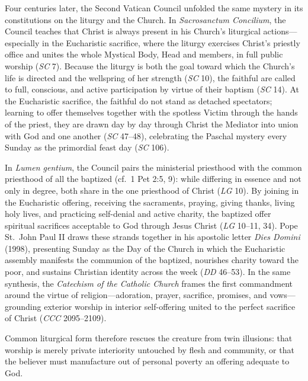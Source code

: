 Four centuries later, the Second Vatican Council unfolded the same mystery in its constitutions on the liturgy and the Church. In \emph{Sacrosanctum Concilium}, the Council teaches that Christ is always present in his Church's liturgical actions---especially in the Eucharistic sacrifice, where the liturgy exercises Christ's priestly office and unites the whole Mystical Body, Head and members, in full public worship (\emph{SC} 7). Because the liturgy is both the goal toward which the Church's life is directed and the wellspring of her strength (\emph{SC} 10), the faithful are called to full, conscious, and active participation by virtue of their baptism (\emph{SC} 14). At the Eucharistic sacrifice, the faithful do not stand as detached spectators; learning to offer themselves together with the spotless Victim through the hands of the priest, they are drawn day by day through Christ the Mediator into union with God and one another (\emph{SC} 47--48), celebrating the Paschal mystery every Sunday as the primordial feast day (\emph{SC} 106).

In \emph{Lumen gentium}, the Council pairs the ministerial priesthood with the common priesthood of all the baptized (cf.\ 1 Pet 2:5, 9): while differing in essence and not only in degree, both share in the one priesthood of Christ (\emph{LG} 10). By joining in the Eucharistic offering, receiving the sacraments, praying, giving thanks, living holy lives, and practicing self-denial and active charity, the baptized offer spiritual sacrifices acceptable to God through Jesus Christ (\emph{LG} 10--11, 34). Pope St.\ John Paul II draws these strands together in his apostolic letter \emph{Dies Domini} (1998), presenting Sunday as the Day of the Church in which the Eucharistic assembly manifests the communion of the baptized, nourishes charity toward the poor, and sustains Christian identity across the week (\emph{DD} 46--53). In the same synthesis, the \emph{Catechism of the Catholic Church} frames the first commandment around the virtue of religion---adoration, prayer, sacrifice, promises, and vows---grounding exterior worship in interior self-offering united to the perfect sacrifice of Christ (\emph{CCC} 2095--2109).

Common liturgical form therefore rescues the creature from twin illusions: that worship is merely private interiority untouched by flesh and community, or that the believer must manufacture out of personal poverty an offering adequate to God.
